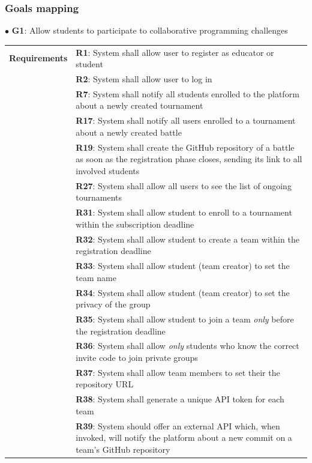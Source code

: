 \subsubsection{Goals mapping}
$\bullet$ \textbf{G1}: Allow students to participate to collaborative programming challenges
\begin{center}
    \begin{tabular}{ |m{3cm}|m{10cm}| }
        \hline
        \textbf{Requirements} 
        & \textbf{R1}: System shall allow user to register as educator or student \\
        & \textbf{R2}: System shall allow user to log in \\
        & \textbf{R7}: System shall notify all students enrolled to the platform about a newly created tournament \\
        & \textbf{R17}: System shall notify all users enrolled to a tournament about a newly created battle \\
        & \textbf{R19}: System shall create the GitHub repository of a battle as soon as the registration phase closes, sending its link to all involved students \\
        & \textbf{R27}: System shall allow all users to see the list of ongoing tournaments \\
        & \textbf{R31}: System shall allow student to enroll to a tournament within the subscription deadline \\
        & \textbf{R32}: System shall allow student to create a team within the registration deadline \\
        & \textbf{R33}: System shall allow student (team creator) to set the team name \\
        & \textbf{R34}: System shall allow student (team creator) to set the privacy of the group \\
        & \textbf{R35}: System shall allow student to join a team \textit{only} before the registration deadline \\
        & \textbf{R36}: System shall allow \textit{only} students who know the correct invite code to join private groups \\
        & \textbf{R37}: System shall allow team members to set their the repository URL \\
        & \textbf{R38}: System shall generate a unique API token for each team \\
        & \textbf{R39}: System should offer an external API which, when invoked, will notify the platform about a new commit on a team’s GitHub repository \\

\end{tabular}
\end{center}
